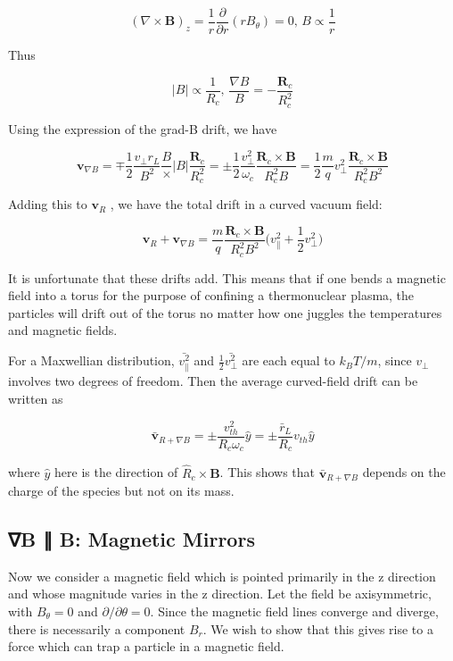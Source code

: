 \documentclass[
  notoc %
]{tufte-book}
\begin{document}
\[
(\nabla\times\mathbf{B})_z = \frac{1}{r}\frac{\partial}{\partial r}(rB_\theta) = 0,\, B\propto \frac{1}{r}
\]

Thus

\[
|B| \propto \frac{1}{R_c},\, \frac{\nabla B}{B} = - \frac{\mathbf{R}_c}{R_c^2}
\]

Using the expression of the grad-B drift, we have

\[
\mathbf{v}_{\nabla B} = \mp \frac{1}{2}\frac{v_\perp r_L}{B^2}\frac{B}\times |B| \frac{\mathbf{R}_c}{R_c^2} = \pm \frac{1}{2}\frac{v_\perp^2}{\omega_c}\frac{\mathbf{R}_c\times\mathbf{B}}{R_c^2 B} = \frac{1}{2}\frac{m}{q}v_\perp^2\frac{\mathbf{R}_c\times\mathbf{B}}{R_c^2 B^2}
\]

Adding this to \(\mathbf{v}_R\) , we have the total drift in a curved
vacuum field:

\[
\mathbf{v}_R + \mathbf{v}_{\nabla B} = \frac{m}{q}\frac{\mathbf{R}_c\times\mathbf{B}}{R_c^2 B^2}\Big( v_\parallel^2 + \frac{1}{2}v_\perp^2 \Big)
\]

It is unfortunate that these drifts add. This means that if one bends a
magnetic field into a torus for the purpose of confining a thermonuclear
plasma, the particles will drift out of the torus no matter how one
juggles the temperatures and magnetic fields.

For a Maxwellian distribution, \(\bar{v_\parallel^2}\) and
\(\frac{1}{2}\bar{v_\perp^2}\) are each equal to \(k_B T/m\), since
\(v_\perp\) involves two degrees of freedom. Then the average
curved-field drift can be written as

\[
\bar{\mathbf{v}}_{R+\nabla B} = \pm \frac{v_{th}^2}{R_c\omega_c}\widehat{y} = \pm\frac{\bar{r}_L}{R_c}v_{th}\widehat{y}
\]

where \(\widehat{y}\) here is the direction of
\(\widehat{R}_c\times\mathbf{B}\). This shows that
\(\bar{\mathbf{v}}_{R+\nabla B}\) depends on the charge of the species
but not on its mass.

\hypertarget{b-b-magnetic-mirrors}{%
\subsection{∇B ∥ B: Magnetic Mirrors}\label{b-b-magnetic-mirrors}}

Now we consider a magnetic field which is pointed primarily in the z
direction and whose magnitude varies in the z direction. Let the field
be axisymmetric, with \(B_\theta = 0\) and
\(\partial/\partial\theta = 0\). Since the magnetic field lines converge
and diverge, there is necessarily a component \(B_r\). We wish to show
that this gives rise to a force which can trap a particle in a magnetic
field.
\end{document}
